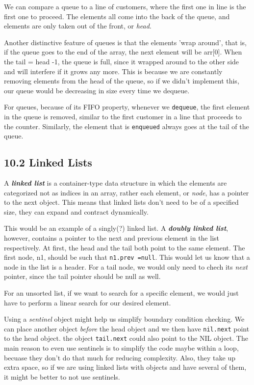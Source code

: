 \documentclass{article}
\begin{document}
We can compare a queue to a line of customers, where the first one in line is the first one to proceed. The elements all
come into the back of the queue, and elements are only taken out of the front, or \textit{head}. 

Another distinctive feature of queues is that the elements 'wrap around', that is, if the queue goes to the end of the 
array, the next element will be arr[0]. When the tail = head -1, the queue is full, since it wrapped around to the other
side and will interfere if it grows any more. This is because we are constantly removing elements from the 
head of the queue, so if we didn't implement this, our queue would be decreasing in size every time 
we dequeue.

For queues, because of its FIFO property, whenever we \texttt{dequeue}, the first element in the queue is
removed, similar to the first customer in a line that proceeds to the counter. Similarly, the element that 
is \texttt{enqueued} always goes at the tail of the queue. 
\subsection{10.2 Linked Lists}
A \textbf{\textit{linked list}} is a container-type data structure in which the elements are categorized not
as indices in an array, rather each element, or \textit{node}, has a pointer to the next object. This means
that linked lists don't need to be of a specified size, they can expand and contract dynamically.

This would be an example of a singly(?) linked list. A \textit{\textbf{doubly linked list}}, however, contains
a pointer to the next and previous element in the list respectively. At first, the head and the tail both 
point to the same element. The first node, n1, should be such that \texttt{n1.prev =null}. This would
let us know that a node in the list is a header. For a tail node, we would only need to chech its \textit{next}
pointer, since the tail pointer should be null as well.

For an unsorted list, if we want to search for a specific element, we would just have to perform a linear search
for our desired element.

Using a \textit{sentinel} object might help us simplify boundary condition checking. We can place another
object \textit{before} the head object and we then have \texttt{nil.next} point to the head object. the object
\texttt{tail.next} could also point to the NIL object. The main reason to even use sentinels is to 
simplify the code maybe within a loop, becuase they don't do that much for reducing complexity.
Also, they take up extra space, so if we are using linked lists with objects and have several of them, it might
be better to not use sentinels.
\end{document}
